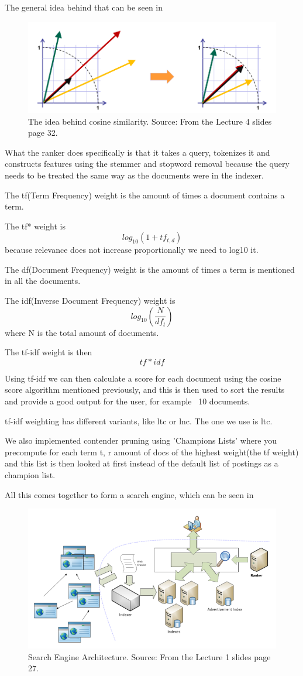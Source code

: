 	The general idea behind that can be seen in 
	
	\begin{figure}[H]
	\centering
	\includegraphics[width=0.7\linewidth]{Media/CosineSimilarity}
	\caption{The idea behind cosine similarity. Source: From the Lecture 4 slides page 32.}
	\label{fig:CosineSimilarity}
	\end{figure}
	
	What the ranker does specifically is that it takes a query, tokenizes it and constructs features using the stemmer and stopword removal because the query needs to be treated the same way as the documents were in the indexer.
	
	The tf(Term Frequency) weight is the amount of times a document contains a term.
	
	The tf* weight is $$log_{10}(1+tf_{t,d})$$ because relevance does not increase proportionally we need to log10 it.
	
	The df(Document Frequency) weight is the amount of times a term is mentioned in all the documents.
	
	The idf(Inverse Document Frequency) weight is $$log_{10}(\frac{N}{df_{t}})$$ where N is the total amount of documents.
	
	The tf-idf weight is then $$tf*idf$$
	
	Using tf-idf we can then calculate a score for each document using the cosine score algorithm mentioned previously, and this is then used to sort the results and provide a good output for the user, for example ~10 documents.
	
	tf-idf weighting has different variants, like ltc or lnc. The one we use is ltc.
	
	We also implemented contender pruning using 'Champions Lists' where you precompute for each term t, r amount of docs of the highest weight(the tf weight) and this list is then looked at first instead of the default list of postings as a champion list.
	
	All this comes together to form a search engine, which can be seen in 
	
	\begin{figure}[H]
	\centering
	\includegraphics[width=0.7\linewidth]{Media/searchenginearchitecture}
	\caption{Search Engine Architecture. Source: From the Lecture 1 slides page 27.}
	\label{fig:searchenginearchitecture}
	\end{figure}
	



